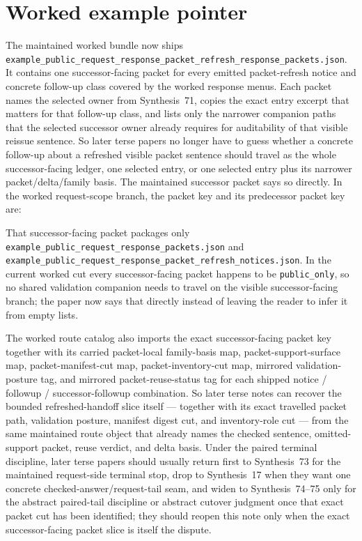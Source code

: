 \documentclass[11pt]{article}
\begin{document}
\section{Worked example pointer}
The maintained worked bundle now ships \nolinkurl{example_public_request_response_packet_refresh_response_packets.json}.\cite{series:workedexample}
It contains one successor-facing packet for every emitted packet-refresh notice and concrete follow-up class covered by the worked response menus.
Each packet names the selected owner from Synthesis~71, copies the exact entry excerpt that matters for that follow-up class, and lists only the narrower companion paths that the selected successor owner already requires for auditability of that visible reissue sentence.
So later terse papers no longer have to guess whether a concrete follow-up about a refreshed visible packet sentence should travel as the whole successor-facing ledger, one selected entry, or one selected entry plus its narrower packet/delta/family basis.
The maintained successor packet says so directly. In the worked request-scope branch, the packet key and its predecessor packet key are:
\begin{quote}\small
{}

\end{quote}
That successor-facing packet packages only \nolinkurl{example_public_request_response_packets.json} and \nolinkurl{example_public_request_response_packet_refresh_notices.json}. In the current worked cut every successor-facing packet happens to be \texttt{public\_only}, so no shared validation companion needs to travel on the visible successor-facing branch; the paper now says that directly instead of leaving the reader to infer it from empty lists.

The worked route catalog also imports the exact successor-facing packet key together with its carried packet-local family-basis map, packet-support-surface map, packet-manifest-cut map, packet-inventory-cut map, mirrored validation-posture tag, and mirrored packet-reuse-status tag for each shipped notice / followup / successor-followup combination. So later terse notes can recover the bounded refreshed-handoff slice itself --- together with its exact travelled packet path, validation posture, manifest digest cut, and inventory-role cut --- from the same maintained route object that already names the checked sentence, omitted-support packet, reuse verdict, and delta basis. Under the paired terminal discipline, later terse papers should usually return first to Synthesis~73 for the maintained request-side terminal stop, drop to Synthesis~17 when they want one concrete checked-answer/request-tail seam, and widen to Synthesis~74--75 only for the abstract paired-tail discipline or abstract cutover judgment once that exact packet cut has been identified; they should reopen this note only when the exact successor-facing packet slice is itself the dispute.\cite{series:pairedterminalcitationdiscipline,series:pairedterminalcutoverrules}
\end{document}
